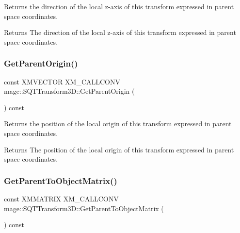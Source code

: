 Returns the direction of the local z-\/axis of this transform expressed in parent space coordinates.

\begin{DoxyReturn}{Returns}
The direction of the local z-\/axis of this transform expressed in parent space coordinates. 
\end{DoxyReturn}
\mbox{\label{classmage_1_1_s_q_t_transform3_d_ae24049b2893e77b6dbefff3bc1519ef2}} 
\subsubsection{\texorpdfstring{Get\+Parent\+Origin()}{GetParentOrigin()}}
{\footnotesize\ttfamily const X\+M\+V\+E\+C\+T\+OR X\+M\+\_\+\+C\+A\+L\+L\+C\+O\+NV mage\+::\+S\+Q\+T\+Transform3\+D\+::\+Get\+Parent\+Origin (\begin{DoxyParamCaption}{ }\end{DoxyParamCaption}) const\hspace{0.3cm}{\ttfamily [noexcept]}}

Returns the position of the local origin of this transform expressed in parent space coordinates.

\begin{DoxyReturn}{Returns}
The position of the local origin of this transform expressed in parent space coordinates. 
\end{DoxyReturn}
\mbox{\label{classmage_1_1_s_q_t_transform3_d_ababf4d1b4bbb747d495b0412cd16fb66}} 
\subsubsection{\texorpdfstring{Get\+Parent\+To\+Object\+Matrix()}{GetParentToObjectMatrix()}}
{\footnotesize\ttfamily const X\+M\+M\+A\+T\+R\+IX X\+M\+\_\+\+C\+A\+L\+L\+C\+O\+NV mage\+::\+S\+Q\+T\+Transform3\+D\+::\+Get\+Parent\+To\+Object\+Matrix (\begin{DoxyParamCaption}{ }\end{DoxyParamCaption}) const\hspace{0.3cm}{\ttfamily [noexcept]}}

